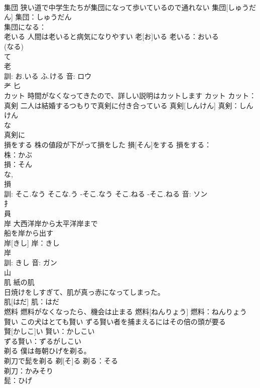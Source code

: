 \documentclass[8pt]{extreport}
\begin{document}
\begin{CJK}{UTF8}{min}
\\	集団	狭い道で中学生たちが集団になって歩いているので通れない	集団[しゅうだん]			集団：しゅうだん
\\	集団になる：			
\\	老いる	人間は老いると病気になりやすい	老[お]いる			老いる：おいる
\\	(なる) 
\\	て		
\\	老 
\\	訓: お.いる ふ.ける 音: ロウ 
\\	耂 匕 
\\	カット	時間がなくなってきたので、詳しい説明はカットします	カット			カット：
\\	真剣	二人は結婚するつもりで真剣に付き合っている	真剣[しんけん]			真剣：しんけん
\\	な 
\\	真剣に
\\	損をする	株の値段が下がって損をした	損[そん]をする			損をする：
\\	株：かぶ
\\	損：そん
\\	な, 
\\	損 
\\	訓: そこ.なう そこな.う -そこ.なう そこ.ねる -そこ.ねる 音: ソン 
\\	扌 
\\	員 
\\	岸	大西洋岸から太平洋岸まで 
\\	船を岸から出す 
\\	岸[きし]			岸：きし
\\	岸 
\\	訓: きし 音: ガン 
\\	山 
\\	肌	紙の肌 
\\	日焼けをしすぎて、肌が真っ赤になってしまった。 
\\	肌[はだ]			肌：はだ
\\	燃料	燃料がなくなったら、機会は止まる	燃料[ねんりょう]			燃料：ねんりょう
\\	賢い	この犬はとても賢い ずる賢い者を捕まえるにはその倍の頭が要る 
\\	賢[かしこ]い			賢い：かしこい
\\	ずる賢い：ずるがしこい
\\	剃る	僕は毎朝ひげを剃る。 
\\	剃刀で髭を剃る	剃[そ]る			剃る：そる
\\	剃刀：かみそり
\\	髭：ひげ

\end{CJK}
\end{document}
